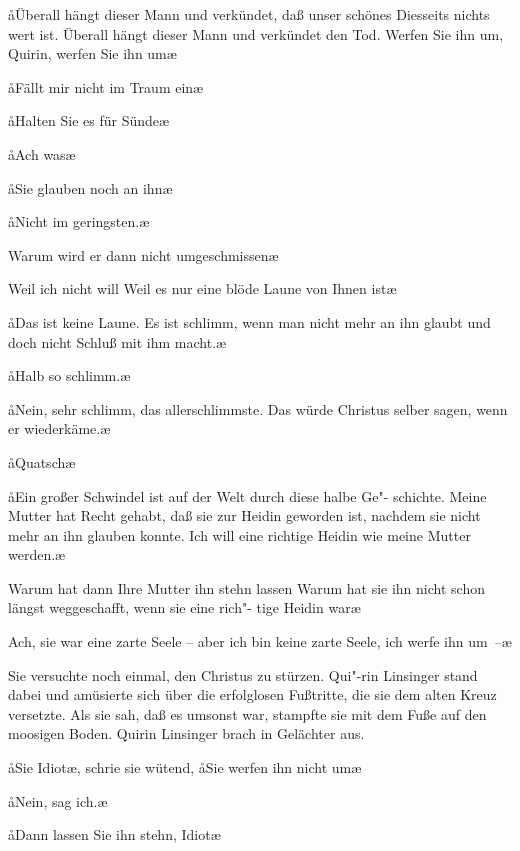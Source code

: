 \aa{}Überall hängt dieser Mann und verkündet, daß unser schönes
Diesseits nichts wert ist. Überall hängt dieser Mann und
verkündet den Tod. Werfen Sie ihn um, Quirin, werfen Sie
ihn um\ausr{}\ae{}

\aa{}Fällt mir nicht im Traum ein\ausr{}\ae{}

\aa{}Halten Sie es für Sünde\frag{}\ae{}

\aa{}Ach was\ausr{}\ae{}

\aa{}Sie glauben noch an ihn\frag{}\ae{}

\aa{}Nicht im geringsten.\ae{}

\aanah{}Warum wird er dann nicht umgeschmissen\frag{}\ae{}

\aanah{}Weil ich nicht will\ausr{} Weil es nur eine blöde Laune von
Ihnen ist\ausr{}\ae{}

\aa{}Das ist keine Laune. Es ist schlimm, wenn man nicht mehr
an ihn glaubt und doch nicht Schluß mit ihm macht.\ae{}

\aa{}Halb so schlimm.\ae{}

\aa{}Nein, sehr schlimm, das allerschlimmste. Das würde Christus
selber sagen, wenn er wiederkäme.\ae{}

\aa{}Quatsch\ausr{}\ae{}

\aa{}Ein großer Schwindel ist auf der Welt durch diese halbe Ge"-%
schichte. Meine Mutter hat Recht gehabt, daß sie zur Heidin
geworden ist, nachdem sie nicht mehr an ihn glauben konnte.
Ich will eine richtige Heidin wie meine Mutter werden.\ae{}

\aanah{}Warum hat dann Ihre Mutter ihn stehn lassen\frag{} Warum
hat sie ihn nicht schon längst weggeschafft, wenn sie eine rich"-%
tige Heidin war\frag{}\ae{}

\aanah{}Ach, sie war eine zarte Seele -- aber ich bin keine zarte Seele,
ich werfe ihn um~--\ae{}

Sie versuchte noch einmal, den Christus zu stürzen. Qui"-rin
Linsinger stand dabei und amüsierte sich über die erfolglosen
Fußtritte, die sie dem alten Kreuz versetzte. Als sie sah, daß
es umsonst war, stampfte sie mit dem Fuße auf den moosigen
Boden. Quirin Linsinger brach in Gelächter aus.

\aa{}Sie Idiot\ae{},\eingriff{eS39-1}{Idiot\ae{}, ] Idiot,\ae{}} schrie sie wütend, \aa{}Sie werfen ihn nicht um\frag{}\ae{}

\aa{}Nein, sag ich.\ae{}

\aa{}Dann lassen Sie ihn stehn, Idiot\ausr{}\ae{}

